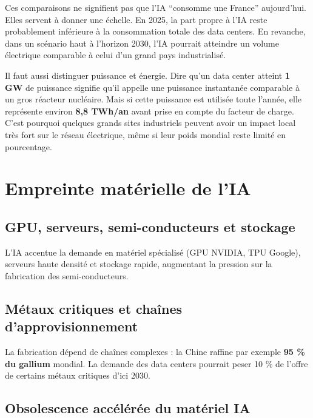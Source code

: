 \documentclass[
  10pt,
  a4paper,
  DIV=11,
  numbers=noendperiod,
  oneside]{scrreprt}
\let\oldtextbf\textbf
\renewcommand{\textbf}[1]{\oldtextbf{\textcolor{cmmnavy}{#1}}}
\begin{document}
Ces comparaisons ne signifient pas que l'IA ``consomme une France''
aujourd'hui. Elles servent à donner une échelle. En 2025, la part propre
à l'IA reste probablement inférieure à la consommation totale des data
centers. En revanche, dans un scénario haut à l'horizon 2030, l'IA
pourrait atteindre un volume électrique comparable à celui d'un grand
pays industrialisé.

Il faut aussi distinguer puissance et énergie. Dire qu'un data center
atteint \textbf{1 GW} de puissance signifie qu'il appelle une puissance
instantanée comparable à un gros réacteur nucléaire. Mais si cette
puissance est utilisée toute l'année, elle représente environ
\textbf{8,8 TWh/an} avant prise en compte du facteur de charge. C'est
pourquoi quelques grands sites industriels peuvent avoir un impact local
très fort sur le réseau électrique, même si leur poids mondial reste
limité en pourcentage.

\section{Empreinte matérielle de
l'IA}\label{empreinte-matuxe9rielle-de-lia}

\subsection{GPU, serveurs, semi-conducteurs et
stockage}\label{gpu-serveurs-semi-conducteurs-et-stockage}

L'IA accentue la demande en matériel spécialisé (GPU NVIDIA, TPU
Google), serveurs haute densité et stockage rapide, augmentant la
pression sur la fabrication des semi-conducteurs.

\subsection{Métaux critiques et chaînes
d'approvisionnement}\label{muxe9taux-critiques-et-chauxeenes-dapprovisionnement}

La fabrication dépend de chaînes complexes : la Chine raffine par
exemple \textbf{95 \% du gallium} mondial. La demande des data centers
pourrait peser 10 \% de l'offre de certains métaux critiques d'ici 2030.

\subsection{Obsolescence accélérée du matériel
IA}\label{obsolescence-accuxe9luxe9ruxe9e-du-matuxe9riel-ia}
\end{document}

